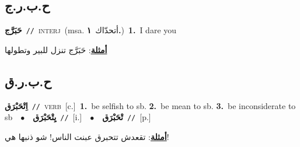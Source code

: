 \documentclass[10pt,a4paper,twoside]{article} %
\begin{document}
\begin{multicols}{2}
{\vspace{-3mm}
\subsection*{\color{blue}\foreignlanguage{arabic}{ح.ب.ر.ج}\color{blue}{ (ntws)}} 

{\setlength\topsep{0pt}\textbf{\foreignlanguage{arabic}{حَبَرَّج}}\ {\color{gray}\texttt{//}\color{black}}\ \textsc{interj}\ \color{gray}(msa. \foreignlanguage{arabic}{أتحدّاك}~\foreignlanguage{arabic}{\textbf{١.}})\color{black}\ \textbf{1.}~I dare you\  \begin{flushright}\color{gray}\foreignlanguage{arabic}{\textbf{\underline{\foreignlanguage{arabic}{أمثلة}}}: حَبَرَّج تنزل للبير وتطولها}\end{flushright}\color{black}} \vspace{2mm}

\vspace{-3mm}
\subsection*{\color{blue}\foreignlanguage{arabic}{ح.ب.ر.ق}\color{blue}{}} 

{\setlength\topsep{0pt}\textbf{\foreignlanguage{arabic}{اِتْحَبْرَق}}\ {\color{gray}\texttt{//}\color{black}}\ \textsc{verb}\ [c.]\ \textbf{1.}~be selfish to sb.  \textbf{2.}~be mean to sb.  \textbf{3.}~be inconsiderate to sb\ \ $\bullet$\ \ \setlength\topsep{0pt}\textbf{\foreignlanguage{arabic}{يِتْحَبْرَق}}\ {\color{gray}\texttt{//}\color{black}}\ [i.]\ \ $\bullet$\ \ \setlength\topsep{0pt}\textbf{\foreignlanguage{arabic}{تْحَبْرَق}}\ {\color{gray}\texttt{//}\color{black}}\ [p.]\  \begin{flushright}\color{gray}\foreignlanguage{arabic}{\textbf{\underline{\foreignlanguage{arabic}{أمثلة}}}: تقعدش تتحبرق عبنت الناس! شو ذنبها هي!}\end{flushright}\color{black}} \vspace{2mm}

}
\end{multicols}
\end{document}
